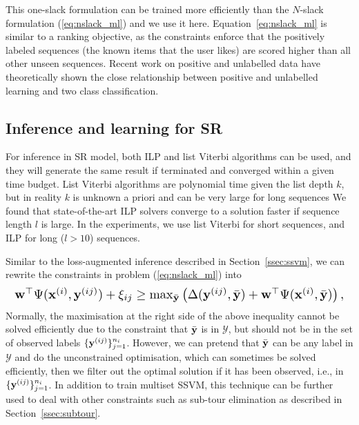 This one-slack formulation can be trained more efficiently than the $N$-slack formulation (\ref{eq:nslack_ml}) and we use it here.
Equation~\ref{eq:nslack_ml} is similar to a ranking objective, as the constraints enforce
that the positively labeled sequences (the known items that the user likes) are scored
higher than all other unseen sequences. Recent work on positive and unlabelled data have
theoretically shown the close relationship between positive and unlabelled learning and two class
classification.





\subsection{Inference and learning for SR}
\label{ssec:SRinf}

For inference in SR model, both ILP and list Viterbi algorithms can be used, and they will generate the
same result if terminated and converged within a given time budget.
List Viterbi algorithms are polynomial time given the list depth $k$,
but in reality $k$ is unknown a priori and can be very large for long sequences
We found that state-of-the-art ILP solvers converge to a solution faster if sequence length $l$ is large.
In the experiments, we use list Viterbi for short sequences, and ILP for long ($l>10$) sequences.

Similar to the loss-augmented inference described in Section~\ref{ssec:ssvm},
we can rewrite the constraints in problem (\ref{eq:nslack_ml}) into
\begin{equation*}
\resizebox{0.99\linewidth}{!}
{$
\w^\top \Psi(\x^{(i)}, \y^{(ij)}) + \xi_{ij} \ge
\max_{\bar{\y}} \left( \Delta(\y^{(ij)}, \bar{\y}) + \w^\top \Psi(\x^{(i)}, \bar{\y}) \right),
$}\eqmoveup
\end{equation*}
Normally, the maximisation at the right side of the above inequality cannot be solved efficiently due to the constraint that
$\bar{\mathbf{y}}$ is in $\mathcal{Y}$,
but should not be in the set of observed labels $\{\mathbf{y}^{(ij)}\}_{j=1}^{n_i}$.
However, we can pretend that $\bar{\mathbf{y}}$ can be any label in $\mathcal{Y}$ and do the unconstrained optimisation,
which can sometimes be solved efficiently, then we filter out the optimal solution if it has been observed,
i.e., in $\{\mathbf{y}^{(ij)}\}_{j=1}^{n_i}$.
In addition to train multiset SSVM, this technique can be further used to deal with other constraints such as sub-tour elimination
as described in Section~\ref{ssec:subtour}.

